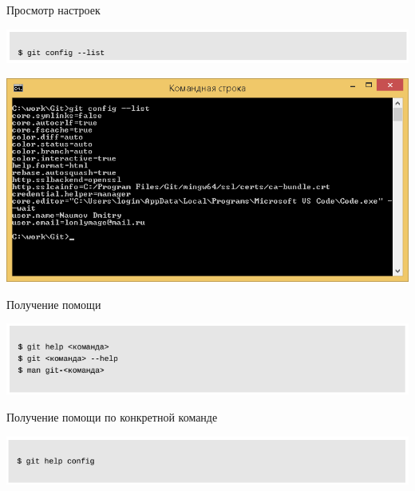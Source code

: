 \documentclass{beamer}
\begin{document}
\begin{frame}
\begin{block}{Просмотр настроек}
\begin{center}
\includegraphics[scale=0.55]{images/config-1.png}
\end{center}
\end{block}
\begin{center}
\includegraphics[scale=0.55]{images/config-2.png}
\end{center}
\end{frame}

\begin{frame}
\begin{block}{Получение помощи}
\begin{center}
\includegraphics[scale=0.55]{images/help-1.png}
\end{center}
\end{block}
\begin{block}{Получение помощи по конкретной команде}
\begin{center}
\includegraphics[scale=0.55]{images/help-2.png}
\end{center}
\end{block}
\end{frame}
\end{document}
